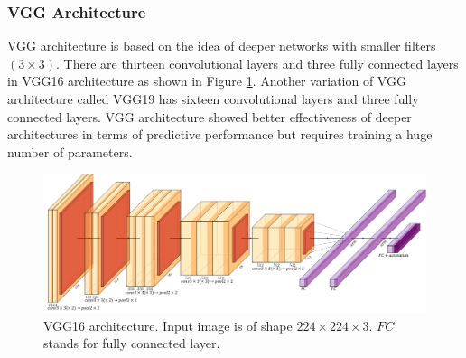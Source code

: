 \subsubsection{VGG Architecture}
VGG architecture \cite{Simonyan2015} is based on the idea of deeper networks with smaller filters $\left(3\times3\right)$. There are thirteen convolutional layers and three fully connected layers in VGG16 architecture as shown in Figure \ref{fig:VGG16}. Another variation of VGG architecture called VGG19 has sixteen convolutional layers and three fully connected layers. VGG architecture showed better effectiveness of deeper architectures in terms of predictive performance but requires training a huge number of parameters. 
\begin{figure}[htb!]
	\centering
	\includegraphics[width=\textwidth,keepaspectratio]{images/pretraining/VGG-cropped.pdf}
	\caption[VGG16 architecture]{VGG16 architecture. Input image is of shape $224\times224\times3$. $FC$ stands for fully connected layer.}
	\label{fig:VGG16}
\end{figure}

